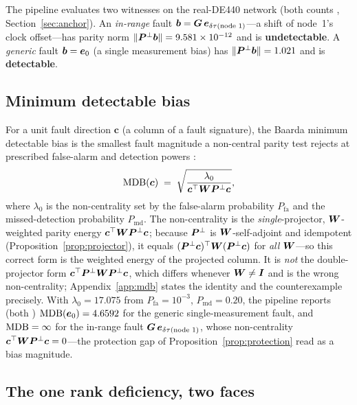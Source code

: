 The pipeline evaluates two witnesses on the real-DE440 network (both counts \Validated{},
Section~\ref{sec:anchor}). An \emph{in-range} fault $\bm{b}=\bm{G}\,\bm e_{\delta\tau(\text{node
}1)}$---a shift of node~1's clock offset---has parity norm $\lVert\bm{P}^{\perp}\bm{b}\rVert=9.581
\times10^{-12}$ and is \textbf{undetectable}. A \emph{generic} fault $\bm{b}=\bm e_0$ (a
single measurement bias) has $\lVert\bm{P}^{\perp}\bm{b}\rVert=1.021$ and is \textbf{detectable}.

\subsection{Minimum detectable bias}
\label{sec:mdb}

For a unit fault direction $\bm c$ (a column of a fault signature), the Baarda minimum
detectable bias is the smallest fault magnitude a non-central parity test rejects at
prescribed false-alarm and detection powers \citep{baarda1968,teunissen2006}:
\begin{equation}
  \operatorname{MDB}(\bm c)\;=\;\sqrt{\frac{\lambda_0}{\bm c^\top\bm{W}\bm{P}^{\perp}\bm c}},
  \label{eq:mdb}
\end{equation}
where $\lambda_0$ is the non-centrality set by the false-alarm probability $P_{\mathrm{fa}}$
and the missed-detection probability $P_{\mathrm{md}}$. The non-centrality is the
\emph{single}-projector, $\bm{W}$-weighted parity energy $\bm c^\top\bm{W}\bm{P}^{\perp}\bm c$; because
$\bm{P}^{\perp}$ is $\bm{W}$-self-adjoint and idempotent (Proposition~\ref{prop:projector}), it equals
$(\bm{P}^{\perp}\bm c)^\top\bm{W}(\bm{P}^{\perp}\bm c)$ for \emph{all} $\bm{W}$---so this correct form is the
weighted energy of the projected column. It is \emph{not} the double-projector form
$\bm c^\top\bm{P}^{\perp}\bm{W}\bm{P}^{\perp}\bm c$, which differs whenever $\bm{W}\neq\bm{I}$ and is the wrong
non-centrality; Appendix~\ref{app:mdb} states the identity and the counterexample precisely.
With $\lambda_0=17.075$ from $P_{\mathrm{fa}}=10^{-3}$, $P_{\mathrm{md}}=0.20$, the pipeline
reports (both \Validated{}) $\operatorname{MDB}(\bm e_0)=4.6592$ for the generic single-measurement fault,
and $\operatorname{MDB}=\infty$ for the in-range fault $\bm{G}\,\bm e_{\delta\tau(\text{node }1)}$, whose
non-centrality $\bm c^\top\bm{W}\bm{P}^{\perp}\bm c=0$---the protection gap of
Proposition~\ref{prop:protection} read as a bias magnitude.

\subsection{The one rank deficiency, two faces}
\label{sec:unification}

